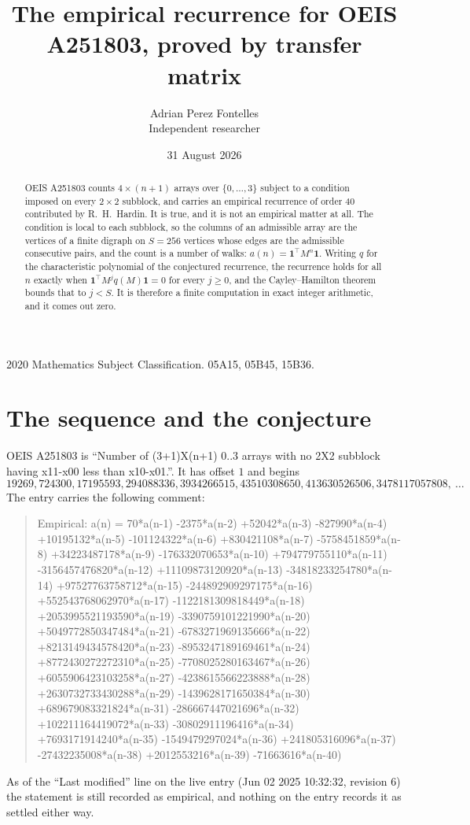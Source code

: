 \documentclass[11pt,a4paper]{article}
\title{The empirical recurrence for OEIS A251803, proved by transfer matrix}
\author{Adrian Perez Fontelles\\ \small Independent researcher}
\date{31 August 2026}
\theoremstyle{plain}
\theoremstyle{definition}
\begin{document}
\maketitle

\begin{abstract}
OEIS A251803 counts $4\times(n+1)$ arrays over $\{0,\dots,3\}$ subject to a condition imposed on
every $2\times2$ subblock, and carries an empirical recurrence of order $40$ contributed
by R.~H.~Hardin. It is true, and it is not an empirical matter at all. The condition is local
to each subblock, so the columns of an admissible array are the vertices of a finite digraph
on $S=256$ vertices whose edges are the admissible consecutive pairs, and the count is a
number of walks: $a(n)=\mathbf{1}^{\!\top}M^{n}\mathbf{1}$. Writing $q$
for the characteristic polynomial of the conjectured recurrence, the recurrence holds for all
$n$ exactly when $\mathbf{1}^{\!\top}M^{j}q(M)\mathbf{1}=0$ for every $j\ge0$, and the
Cayley--Hamilton theorem bounds that to $j<S$. It is therefore a finite computation in exact
integer arithmetic, and it comes out zero.
\end{abstract}

\noindent\small 2020 Mathematics Subject Classification. 05A15, 05B45, 15B36.\normalsize

\section{The sequence and the conjecture}

OEIS A251803 is ``Number of (3+1)X(n+1) 0..3 arrays with no 2X2 subblock having x11-x00 less than x10-x01.''. It has offset $1$ and begins
\[
19269, 724300, 17195593, 294088336, 3934266515, 43510308650, 413630526506, 3478117057808,\ \dots
\]
The entry carries the following comment:
\begin{quote}\small
Empirical: a(n) = 70*a(n-1) -2375*a(n-2) +52042*a(n-3) -827990*a(n-4) +10195132*a(n-5) -101124322*a(n-6) +830421108*a(n-7) -5758451859*a(n-8) +34223487178*a(n-9) -176332070653*a(n-10) +794779755110*a(n-11) -3156457476820*a(n-12) +11109873120920*a(n-13) -34818233254780*a(n-14) +97527763758712*a(n-15) -244892909297175*a(n-16) +552543768062970*a(n-17) -1122181309818449*a(n-18) +2053995521193590*a(n-19) -3390759101221990*a(n-20) +5049772850347484*a(n-21) -6783271969135666*a(n-22) +8213149434578420*a(n-23) -8953247189169461*a(n-24) +8772430272272310*a(n-25) -7708025280163467*a(n-26) +6055906423103258*a(n-27) -4238615566223888*a(n-28) +2630732733430288*a(n-29) -1439628171650384*a(n-30) +689679083321824*a(n-31) -286667447021696*a(n-32) +102211164419072*a(n-33) -30802911196416*a(n-34) +7693171914240*a(n-35) -1549479297024*a(n-36) +241805316096*a(n-37) -27432235008*a(n-38) +2012553216*a(n-39) -71663616*a(n-40)
\end{quote}
As of the ``Last modified'' line on the live entry (Jun 02 2025 10:32:32, revision 6) the statement is
still recorded as empirical, and nothing on the entry records it as settled either way.
\end{document}

